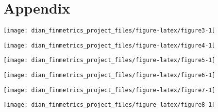 \documentclass[11pt,preprint, authoryear]{elsarticle}
\let\origfigure\figure
\let\endorigfigure\endfigure
\renewenvironment{figure}[1][2] {
    \expandafter\origfigure\expandafter[H]
} {
    \endorigfigure
}
\numberwithin{equation}{section}
\numberwithin{figure}{section}
\numberwithin{table}{section}
\begin{document}
\newpage

\section{\texorpdfstring{Appendix
\label{appendix}}{Appendix }}\label{appendix}

\begin{figure}[H]

{\centering \texttt{[image: dian\_finmetrics\_project\_files/figure-latex/figure3-1]} 

}

\caption{Dynanmic correlation \label{figure3}}\label{fig:figure3}
\end{figure}

\begin{figure}[H]

{\centering \texttt{[image: dian\_finmetrics\_project\_files/figure-latex/figure4-1]} 

}

\caption{Dynanmic correlation \label{figure4}}\label{fig:figure4}
\end{figure}

\begin{figure}[H]

{\centering \texttt{[image: dian\_finmetrics\_project\_files/figure-latex/figure5-1]} 

}

\caption{Dynanmic correlation \label{figure5}}\label{fig:figure5}
\end{figure}

\begin{figure}[H]

{\centering \texttt{[image: dian\_finmetrics\_project\_files/figure-latex/figure6-1]} 

}

\caption{Dynanmic correlation \label{figure6}}\label{fig:figure6}
\end{figure}

\begin{figure}[H]

{\centering \texttt{[image: dian\_finmetrics\_project\_files/figure-latex/figure7-1]} 

}

\caption{Dynanmic correlation \label{figure7}}\label{fig:figure7}
\end{figure}

\begin{figure}[H]

{\centering \texttt{[image: dian\_finmetrics\_project\_files/figure-latex/figure8-1]} 

}

\caption{Dynanmic correlation \label{figure8}}\label{fig:figure8}
\end{figure}
\end{document}
